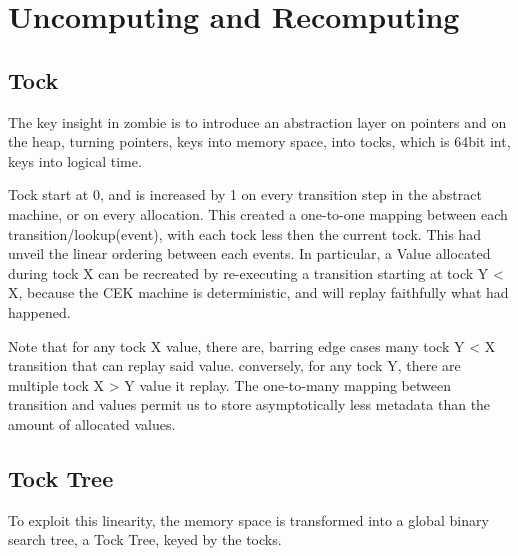 \section{Uncomputing and Recomputing}
\subsection{Tock}
The key insight in zombie is to introduce an abstraction layer on pointers and on the heap, turning pointers, keys into memory space, into tocks, which is 64bit int, keys into logical time.

Tock start at 0, and is increased by 1 on every transition step in the abstract machine, or on every allocation. This created a one-to-one mapping between each transition/lookup(event), with each tock less then the current tock. This had unveil the linear ordering between each events. In particular, a Value allocated during tock X can be recreated by re-executing a transition starting at tock Y < X, because the CEK machine is deterministic, and will replay faithfully what had happened.

Note that for any tock X value, there are, barring edge cases many tock Y < X transition that can replay said value. conversely, for any tock Y, there are multiple tock X > Y value it replay. The one-to-many mapping between transition and values permit us to store asymptotically less metadata than the amount of allocated values.
\subsection{Tock Tree}
To exploit this linearity, the memory space is transformed into a global binary search tree, a Tock Tree, keyed by the tocks.

